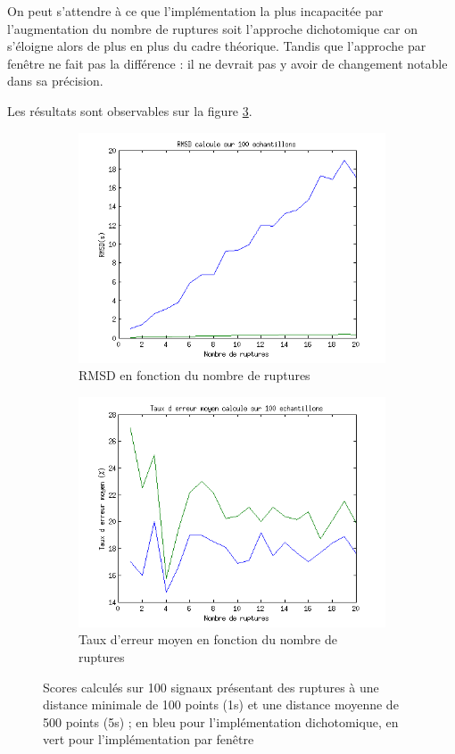 \documentclass[french,11pt,notitlepage]{report}
\begin{document}
	On peut s'attendre à ce que l'implémentation la plus incapacitée par l'augmentation du nombre de ruptures soit l'approche dichotomique car on s'éloigne alors de plus en plus du cadre théorique.
	Tandis que l'approche par fenêtre ne fait pas la différence : il ne devrait pas y avoir de changement notable dans sa précision.
	
	Les résultats sont observables sur la figure \ref{score_rupt}.
	
	\begin{figure}[tp]
		\begin{subfigure}[t]{.49\textwidth}
		  \includegraphics[width=\linewidth,height=.24\textheight]{rmsd_rupt}
			\caption{RMSD en fonction du nombre de ruptures}
			\label{}
		\end{subfigure}
		\hfill
		\begin{subfigure}[t]{.49\textwidth}
			\includegraphics[width=\linewidth,height=.24\textheight]{erratemean_rupt}
			\caption{Taux d'erreur moyen en fonction du nombre de ruptures}
			\label{}
		\end{subfigure}
	\caption{Scores calculés sur 100 signaux présentant des ruptures à une distance minimale de 100 points (1s) et une distance moyenne de 500 points (5s) ; en bleu pour l'implémentation dichotomique, en vert pour l'implémentation par fenêtre}
	\label{score_rupt}
	\end{figure}	
	
\end{document}
